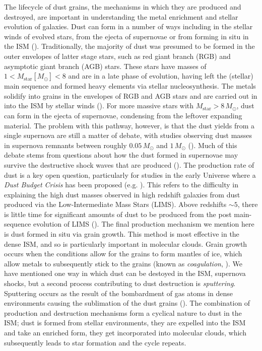 The lifecycle of dust grains, the mechanisms in which they are produced and destroyed, are important in understanding the metal enrichment and stellar evolution of galaxies. Dust can form in a number of ways including in the stellar winds of evolved stars, from the ejecta of supernovae or from forming in situ in the ISM (\citealt{Draine_2009}). Traditionally, the majority of dust was presumed to be formed in the outer envelopes of latter stage stars, such as red giant branch (RGB) and asymptotic giant branch (AGB) stars. These stars have masses of $1 < M_\textrm{star} [M_\odot] < 8$ and are in a late phase of evolution, having left the (stellar) main sequence and formed heavy elements via stellar nucleosynthesis. The metals solidify into grains in the envelopes of RGB and AGB stars and are carried out in into the ISM by stellar winds (\citealt{Whittet_2002}). For more massive stars with $M_\textrm{star} > 8\,M_\odot$, dust can form in the ejecta of supernovae, condensing from the leftover expanding material. The problem with this pathway, however, is that the dust yields from a single supernova are still a matter of debate, with studies observing dust masses in supernova remnants between roughly $0.05\,M_\odot$ and $1\,M_\odot$ (\citealt{Rho_2008, Dunne_2009, Barlow_2010, Matsuura_2011, Gomez_2012, Matsuura_2015, Chawner_2019}). Much of this debate stems from questions about how the dust formed in supernovae may survive the destructive shock waves that are produced (\citealt{Draine_1979, Jones_1996}). The production rate of dust is a key open question, particularly for studies in the early Universe where a \textit{Dust Budget Crisis} has been proposed (e.g. \citealt{Dwek_2007, Michalowski_2010, Valiante_2011}). This refers to the difficulty in explaining the high dust masses observed in high redshift galaxies from dust produced via the Low-Intermediate Mass Stars (LIMS). Above redshifts $\sim 5$, there is little time for significant amounts of dust to be produced from the post main-sequence evolution of LIMS (\citealt{Morgan_2003, DiCriscienzo_2013}). The final production mechanism we mention here is dust formed in situ via grain growth. This method is most effective in the dense ISM, and so is particularly important in molecular clouds. Grain growth occurs when the conditions allow for the grains to form mantles of ice, which allow metals to subsequently stick to the grains (known as \textit{coagulation}, \citealt{Blain_2004}). We have mentioned one way in which dust can be destoyed in the ISM, supernova shocks, but a second process contributing to dust destruction is \textit{sputtering}. Sputtering occurs as the result of the bombardment of gas atoms in dense environments causing the sublimation of the dust grains (\citealt{Barlow_1978, Jones_2004}). The combination of production and destruction mechanisms form a cyclical nature to dust in the ISM; dust is formed from stellar environments, they are expelled into the ISM and take an enriched form, they get incorporated into molecular clouds, which subsequently leads to star formation and the cycle repeats.

